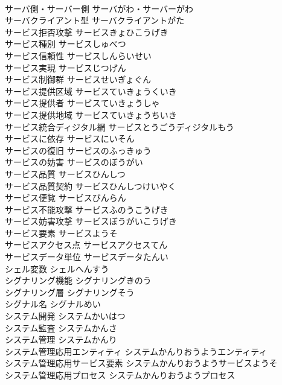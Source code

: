 \documentclass[8pt]{extreport}
\begin{document}
\begin{CJK}{UTF8}{min}
\\	サーバ側・サーバー側	サーバがわ・サーバーがわ	
\\	サーバクライアント型	サーバクライアントがた	
\\	サービス拒否攻撃	サービスきょひこうげき	
\\	サービス種別	サービスしゅべつ	
\\	サービス信頼性	サービスしんらいせい	
\\	サービス実現	サービスじつげん	
\\	サービス制御群	サービスせいぎょぐん	
\\	サービス提供区域	サービスていきょうくいき	
\\	サービス提供者	サービスていきょうしゃ	
\\	サービス提供地域	サービスていきょうちいき	
\\	サービス統合ディジタル網	サービスとうごうディジタルもう	
\\	サービスに依存	サービスにいそん	
\\	サービスの復旧	サービスのふっきゅう	
\\	サービスの妨害	サービスのぼうがい	
\\	サービス品質	サービスひんしつ	
\\	サービス品質契約	サービスひんしつけいやく	
\\	サービス便覧	サービスびんらん	
\\	サービス不能攻撃	サービスふのうこうげき	
\\	サービス妨害攻撃	サービスぼうがいこうげき	
\\	サービス要素	サービスようそ	
\\	サービスアクセス点	サービスアクセスてん	
\\	サービスデータ単位	サービスデータたんい	
\\	シェル変数	シェルへんすう	
\\	シグナリング機能	シグナリングきのう	
\\	シグナリング層	シグナリングそう	
\\	シグナル名	シグナルめい	
\\	システム開発	システムかいはつ	
\\	システム監査	システムかんさ	
\\	システム管理	システムかんり	
\\	システム管理応用エンティティ	システムかんりおうようエンティティ	
\\	システム管理応用サービス要素	システムかんりおうようサービスようそ	
\\	システム管理応用プロセス	システムかんりおうようプロセス	

\end{CJK}
\end{document}
